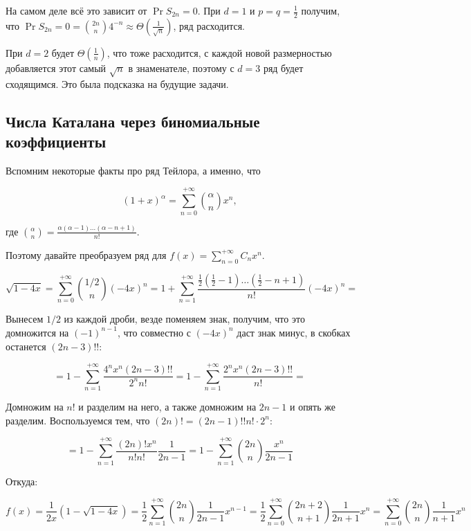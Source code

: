 На самом деле всё это зависит от $\Pr{S_{2n} = 0}$. При $d = 1$ и $p = q = \frac{1}{2}$
получим, что $\Pr{S_{2n} = 0} = \binom{2n}{n}4^{-n} \approx \Theta\left(\frac{1}{\sqrt{n}}\right)$, ряд расходится.

При $d = 2$ будет $\Theta\left(\frac{1}{n}\right)$, что тоже расходится, с каждой
новой размерностью добавляется этот самый $\sqrt{n}$ в знаменателе, поэтому
с $d = 3$ ряд будет сходящимся. Это была подсказка на будущие задачи.

\subsection{Числа Каталана через биномиальные коэффициенты}
Вспомним некоторые факты про ряд Тейлора, а именно, что

\[
  (1 + x)^{\alpha} = \sum\limits_{n = 0}^{+\infty} \binom{\alpha}{n}x^n,
\]

где $\binom{\alpha}{n} = \frac{\alpha(\alpha - 1)\ldots (\alpha - n + 1)}{n!}$.

Поэтому давайте преобразуем ряд для $f(x) = \sum\limits_{n = 0}^{+\infty} C_n x^n$.

\[
  \sqrt{1 - 4x} = \sum\limits_{n = 0}^{+\infty} \binom{1/2}{n}(-4x)^n = 
  1 + \sum\limits_{n = 1}^{+\infty} \frac{\frac{1}{2}\left(\frac{1}{2} - 1\right)
  \ldots\left(\frac{1}{2} - n + 1\right)}{n!}(-4x)^n = 
\]

Вынесем $1/2$ из каждой дроби, везде поменяем знак, получим, что это домножится
на $(-1)^{n - 1}$, что совместно с $(-4x)^n$ даст знак минус, в скобках
останется $(2n - 3)!!$:

\[
  = 1 - \sum\limits_{n = 1}^{+\infty} \frac{4^n x^n (2n - 3)!!}{2^n n!} =
  1 - \sum\limits_{n = 1}^{+\infty} \frac{2^n x^n (2n - 3)!!}{n!} = 
\]

Домножим на $n!$ и разделим на него, а также домножим на $2n - 1$ и опять же
разделим. Воспользуемся тем, что $(2n)! = (2n - 1)!! n! \cdot 2^n$:

\[
  = 1 - \sum\limits_{n = 1}^{+\infty} \frac{(2n)!x^n}{n!n!}\frac{1}{2n - 1} =
  1 - \sum\limits_{n = 1}^{+\infty} \binom{2n}{n} \frac{x^n}{2n - 1}
\]

Откуда:

\[
  f(x) = \frac{1}{2x}(1 - \sqrt{1 - 4x}) = \frac{1}{2}\sum\limits_{n = 1}^{+\infty}
  \binom{2n}{n} \frac{1}{2n - 1}x^{n - 1} = 
  \frac{1}{2}\sum\limits_{n = 0}^{+\infty} \binom{2n + 2}{n + 1} \frac{1}{2n + 1}x^{n} =
  \sum\limits_{n = 0}^{+\infty} \binom{2n}{n} \frac{1}{n + 1}x^{n}
\]

